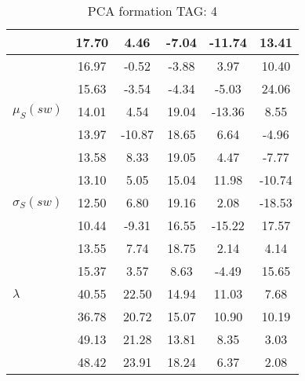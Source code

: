 \begin{table}[h!]
\begin{center}
\begin{tabular}{| l | c | c | c | c | c |}
 & 17.70  & 4.46  & -7.04  & -11.74  & 13.41 \\\hline
 & 16.97  & -0.52  & -3.88  & 3.97  & 10.40 \\\hline
 & 15.63  & -3.54  & -4.34  & -5.03  & 24.06 \\\hline
$\mu_S(sw)$ & 14.01  & 4.54  & 19.04  & -13.36  & 8.55 \\\hline
 & 13.97  & -10.87  & 18.65  & 6.64  & -4.96 \\\hline
 & 13.58  & 8.33  & 19.05  & 4.47  & -7.77 \\\hline
 & 13.10  & 5.05  & 15.04  & 11.98  & -10.74 \\\hline
$\sigma_S(sw)$ & 12.50  & 6.80  & 19.16  & 2.08  & -18.53 \\\hline
 & 10.44  & -9.31  & 16.55  & -15.22  & 17.57 \\\hline
 & 13.55  & 7.74  & 18.75  & 2.14  & 4.14 \\\hline
 & 15.37  & 3.57  & 8.63  & -4.49  & 15.65 \\\hline
$\lambda$ & 40.55  & 22.50  & 14.94  & 11.03  & 7.68 \\\hline
 & 36.78  & 20.72  & 15.07  & 10.90  & 10.19 \\\hline
 & 49.13  & 21.28  & 13.81  & 8.35  & 3.03 \\\hline
 & 48.42  & 23.91  & 18.24  & 6.37  & 2.08 \\\hline
\end{tabular}
\caption{PCA formation TAG: 4}
\end{center}
\end{table}